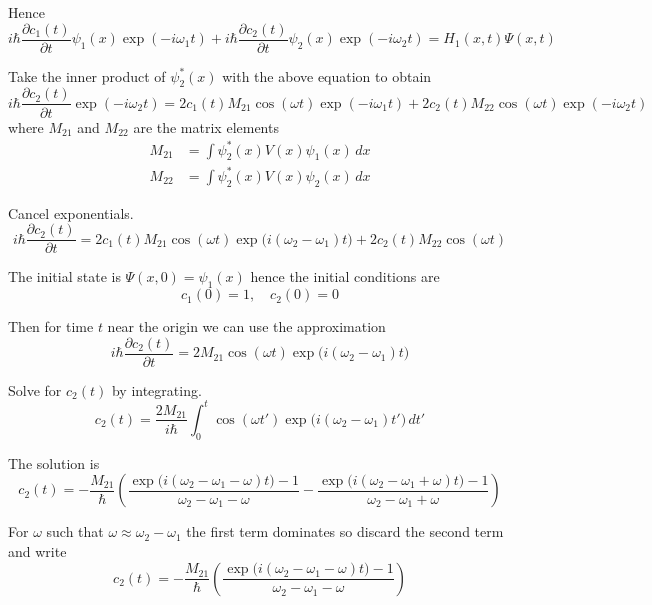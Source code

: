 \documentclass[12pt]{article}
\begin{document}
Hence
\begin{equation*}
i\hbar\frac{\partial c_1(t)}{\partial t}\psi_1(x)\exp(-i\omega_1t)
+i\hbar\frac{\partial c_2(t)}{\partial t}\psi_2(x)\exp(-i\omega_2t)
=H_1(x,t)\Psi(x,t)
\end{equation*}

Take the inner product of $\psi_2^*(x)$ with the above equation to obtain
\begin{equation*}
i\hbar\frac{\partial c_2(t)}{\partial t}\exp(-i\omega_2t)
=2c_1(t)M_{21}\cos(\omega t)\exp(-i\omega_1t)+2c_2(t)M_{22}\cos(\omega t)\exp(-i\omega_2t)
\end{equation*}
%
where $M_{21}$ and $M_{22}$ are the matrix elements
\begin{align*}
M_{21}&=\int\psi_2^*(x)V(x)\psi_1(x)\,dx
\\
M_{22}&=\int\psi_2^*(x)V(x)\psi_2(x)\,dx
\end{align*}

Cancel exponentials.
\begin{equation*}
i\hbar\frac{\partial c_2(t)}{\partial t}
=2c_1(t)M_{21}\cos(\omega t)\exp\bigl(i(\omega_2-\omega_1)t\bigr)+2c_2(t)M_{22}\cos(\omega t)
\end{equation*}

The initial state is $\Psi(x,0)=\psi_1(x)$ hence the initial conditions are
\begin{equation*}
c_1(0)=1,\quad c_2(0)=0
\end{equation*}

Then for time $t$ near the origin we can use the approximation
\begin{equation*}
i\hbar\frac{\partial c_2(t)}{\partial t}
=2M_{21}\cos(\omega t)\exp\bigl(i(\omega_2-\omega_1)t\bigr)
\end{equation*}

Solve for $c_2(t)$ by integrating.
\begin{equation*}
c_2(t)=\frac{2M_{21}}{i\hbar}
\int_0^t\cos(\omega t')\exp\bigl(i(\omega_2-\omega_1)t'\bigr)\,dt'
\end{equation*}

The solution is
\begin{equation*}
c_2(t)
=-\frac{M_{21}}{\hbar}
\left(
\frac{\exp\bigl(i(\omega_2-\omega_1-\omega) t\bigr)-1}{\omega_2-\omega_1-\omega}
-
\frac{\exp\bigl(i(\omega_2-\omega_1+\omega) t\bigr)-1}{\omega_2-\omega_1+\omega}
\right)
\tag{1}
\end{equation*}

For $\omega$ such that $\omega\approx\omega_2-\omega_1$ the first term
dominates so discard the second term and write
\begin{equation*}
c_2(t)=-\frac{M_{21}}{\hbar}
\left(
\frac{\exp\bigl(i(\omega_2-\omega_1-\omega) t\bigr)-1}{\omega_2-\omega_1-\omega}
\right)
\end{equation*}
\end{document}

